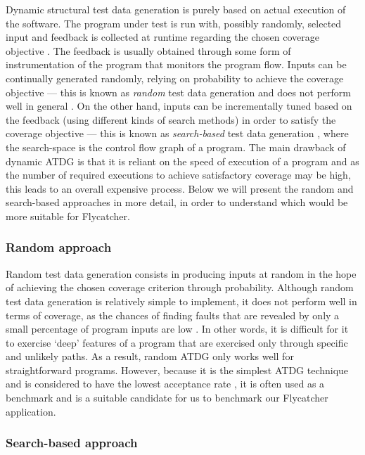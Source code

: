 \documentclass[a4paper,11pt,titlepage]{report}
\begin{document}
Dynamic structural test data generation is purely based on actual execution of the software. The program under test is run with, possibly randomly, selected input and feedback is collected at runtime regarding the chosen coverage objective \cite{edvardsson1999survey}. The feedback is usually obtained through some form of instrumentation of the program that monitors the program flow. Inputs can be continually generated randomly, relying on probability to achieve the coverage objective --- this is known as \emph{random} test data generation and does not perform well in general \cite{edvardsson1999survey}. On the other hand, inputs can be incrementally tuned based on the feedback (using different kinds of search methods) in order to satisfy the coverage objective --- this is known as \emph{search-based} test data generation \cite{mcminn2004search}, where the search-space is the control flow graph of a program. The main drawback of dynamic ATDG is that it is reliant on the speed of execution of a program and as the number of required executions to achieve satisfactory coverage may be high, this leads to an overall expensive process. Below we will present the random and search-based approaches in more detail, in order to understand which would be more suitable for Flycatcher.

\subsubsection{Random approach}

Random test data generation consists in producing inputs at random in the hope of achieving the chosen coverage criterion through probability. Although random test data generation is relatively simple to implement, it does not perform well in terms of coverage, as the chances of finding faults that are revealed by only a small percentage of program inputs are low \cite{edvardsson1999survey}. In other words, it is difficult for it to exercise `deep' features of a program that are exercised only through specific and unlikely paths. As a result, random ATDG only works well for straightforward programs. However, because it is the simplest ATDG technique and is considered to have the lowest acceptance rate \cite{edvardsson1999survey}, it is often used as a benchmark and is a suitable candidate for us to benchmark our Flycatcher application.

\subsubsection{Search-based approach}
\end{document}

